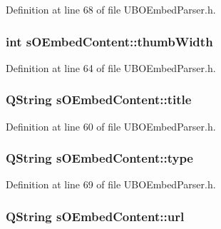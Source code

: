 Definition at line 68 of file U\-B\-O\-Embed\-Parser.\-h.

\hypertarget{structs_o_embed_content_a0337e97679d083c49a665101f135b96a}{
\subsubsection[{thumb\-Width}]{\setlength{\rightskip}{0pt plus 5cm}int s\-O\-Embed\-Content\-::thumb\-Width}}\label{d9/d62/structs_o_embed_content_a0337e97679d083c49a665101f135b96a}


Definition at line 64 of file U\-B\-O\-Embed\-Parser.\-h.

\hypertarget{structs_o_embed_content_a99a43aa9bb7239b4fc67200c58b50c28}{
\subsubsection[{title}]{\setlength{\rightskip}{0pt plus 5cm}Q\-String s\-O\-Embed\-Content\-::title}}\label{d9/d62/structs_o_embed_content_a99a43aa9bb7239b4fc67200c58b50c28}


Definition at line 60 of file U\-B\-O\-Embed\-Parser.\-h.

\hypertarget{structs_o_embed_content_ae7c0ff53591ca3049ca84a7ee55cd1d7}{
\subsubsection[{type}]{\setlength{\rightskip}{0pt plus 5cm}Q\-String s\-O\-Embed\-Content\-::type}}\label{d9/d62/structs_o_embed_content_ae7c0ff53591ca3049ca84a7ee55cd1d7}


Definition at line 69 of file U\-B\-O\-Embed\-Parser.\-h.

\hypertarget{structs_o_embed_content_a5e8bca648a2390740dbae9cc8d8f0603}{
\subsubsection[{url}]{\setlength{\rightskip}{0pt plus 5cm}Q\-String s\-O\-Embed\-Content\-::url}}\label{d9/d62/structs_o_embed_content_a5e8bca648a2390740dbae9cc8d8f0603}


